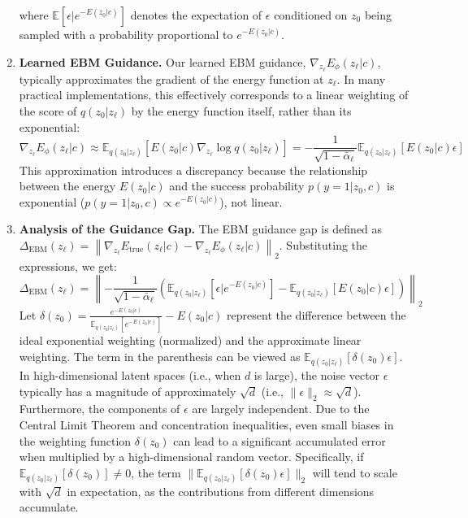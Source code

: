 \documentclass{article} %
\begin{document}
\begin{enumerate}
\[    \]
    where $\mathbb{E}[\epsilon | e^{-E(z_0|c)}]$ denotes the expectation of $\epsilon$ conditioned on $z_0$ being sampled with a probability proportional to $e^{-E(z_0|c)}$.
    \item \textbf{Learned EBM Guidance.}
    Our learned EBM guidance, $\nabla_{z_\ell} E_\phi(z_\ell|c)$, typically approximates the gradient of the energy function at $z_\ell$. In many practical implementations, this effectively corresponds to a linear weighting of the score of $q(z_0|z_\ell)$ by the energy function itself, rather than its exponential:
    \[
    \nabla_{z_\ell} E_\phi(z_\ell|c) \approx \mathbb{E}_{q(z_0|z_\ell)}[E(z_0|c) \nabla_{z_\ell} \log q(z_0|z_\ell)] = -\frac{1}{\sqrt{1-\bar{\alpha}_\ell}} \mathbb{E}_{q(z_0|z_\ell)}[E(z_0|c) \epsilon]
    \]
    This approximation introduces a discrepancy because the relationship between the energy $E(z_0|c)$ and the success probability $p(y=1|z_0,c)$ is exponential ($p(y=1|z_0,c) \propto e^{-E(z_0|c)}$), not linear.
    \item \textbf{Analysis of the Guidance Gap.}
    The EBM guidance gap is defined as $\Delta_{\text{EBM}}(z_\ell) = \left\|\nabla_{z_\ell} E_{\text{true}}(z_\ell|c) - \nabla_{z_\ell} E_\phi(z_\ell|c)\right\|_2$.
    Substituting the expressions, we get:
    \[
    \Delta_{\text{EBM}}(z_\ell) = \left\| -\frac{1}{\sqrt{1-\bar{\alpha}_\ell}} \left( \mathbb{E}_{q(z_0|z_\ell)}[\epsilon | e^{-E(z_0|c)}] - \mathbb{E}_{q(z_0|z_\ell)}[E(z_0|c) \epsilon] \right) \right\|_2
    \]
    Let $\delta(z_0) = \frac{e^{-E(z_0|c)}}{\mathbb{E}_{q(z_0|z_\ell)}[e^{-E(z_0|c)}]} - E(z_0|c)$ represent the difference between the ideal exponential weighting (normalized) and the approximate linear weighting. The term in the parenthesis can be viewed as $\mathbb{E}_{q(z_0|z_\ell)}[\delta(z_0) \epsilon]$.
    In high-dimensional latent spaces (i.e., when $d$ is large), the noise vector $\epsilon$ typically has a magnitude of approximately $\sqrt{d}$ (i.e., $\|\epsilon\|_2 \approx \sqrt{d}$). Furthermore, the components of $\epsilon$ are largely independent. Due to the Central Limit Theorem and concentration inequalities, even small biases in the weighting function $\delta(z_0)$ can lead to a significant accumulated error when multiplied by a high-dimensional random vector.
    Specifically, if $\mathbb{E}_{q(z_0|z_\ell)}[\delta(z_0)] \neq 0$, the term $\|\mathbb{E}_{q(z_0|z_\ell)}[\delta(z_0) \epsilon]\|_2$ will tend to scale with $\sqrt{d}$ in expectation, as the contributions from different dimensions accumulate.
\end{enumerate}
\end{document}
